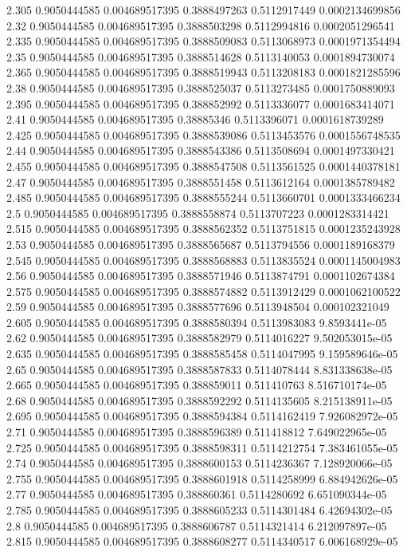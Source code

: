 {2.305 0.9050444585 0.004689517395 0.3888497263 0.5112917449 0.0002134699856
2.32 0.9050444585 0.004689517395 0.3888503298 0.5112994816 0.0002051296541
2.335 0.9050444585 0.004689517395 0.3888509083 0.5113068973 0.0001971354494
2.35 0.9050444585 0.004689517395 0.3888514628 0.5113140053 0.0001894730074
2.365 0.9050444585 0.004689517395 0.3888519943 0.5113208183 0.0001821285596
2.38 0.9050444585 0.004689517395 0.3888525037 0.5113273485 0.0001750889093
2.395 0.9050444585 0.004689517395 0.388852992 0.5113336077 0.0001683414071
2.41 0.9050444585 0.004689517395 0.38885346 0.5113396071 0.0001618739289
2.425 0.9050444585 0.004689517395 0.3888539086 0.5113453576 0.0001556748535
2.44 0.9050444585 0.004689517395 0.3888543386 0.5113508694 0.0001497330421
2.455 0.9050444585 0.004689517395 0.3888547508 0.5113561525 0.0001440378181
2.47 0.9050444585 0.004689517395 0.3888551458 0.5113612164 0.0001385789482
2.485 0.9050444585 0.004689517395 0.3888555244 0.5113660701 0.0001333466234
2.5 0.9050444585 0.004689517395 0.3888558874 0.5113707223 0.0001283314421
2.515 0.9050444585 0.004689517395 0.3888562352 0.5113751815 0.0001235243928
2.53 0.9050444585 0.004689517395 0.3888565687 0.5113794556 0.0001189168379
2.545 0.9050444585 0.004689517395 0.3888568883 0.5113835524 0.0001145004983
2.56 0.9050444585 0.004689517395 0.3888571946 0.5113874791 0.0001102674384
2.575 0.9050444585 0.004689517395 0.3888574882 0.5113912429 0.0001062100522
2.59 0.9050444585 0.004689517395 0.3888577696 0.5113948504 0.000102321049
2.605 0.9050444585 0.004689517395 0.3888580394 0.5113983083 9.8593441e-05
2.62 0.9050444585 0.004689517395 0.3888582979 0.5114016227 9.502053015e-05
2.635 0.9050444585 0.004689517395 0.3888585458 0.5114047995 9.159589646e-05
2.65 0.9050444585 0.004689517395 0.3888587833 0.5114078444 8.831338638e-05
2.665 0.9050444585 0.004689517395 0.388859011 0.511410763 8.516710174e-05
2.68 0.9050444585 0.004689517395 0.3888592292 0.5114135605 8.215138911e-05
2.695 0.9050444585 0.004689517395 0.3888594384 0.5114162419 7.926082972e-05
2.71 0.9050444585 0.004689517395 0.3888596389 0.511418812 7.649022965e-05
2.725 0.9050444585 0.004689517395 0.3888598311 0.5114212754 7.383461055e-05
2.74 0.9050444585 0.004689517395 0.3888600153 0.5114236367 7.128920066e-05
2.755 0.9050444585 0.004689517395 0.3888601918 0.5114258999 6.884942626e-05
2.77 0.9050444585 0.004689517395 0.388860361 0.5114280692 6.651090344e-05
2.785 0.9050444585 0.004689517395 0.3888605233 0.5114301484 6.42694302e-05
2.8 0.9050444585 0.004689517395 0.3888606787 0.5114321414 6.212097897e-05
2.815 0.9050444585 0.004689517395 0.3888608277 0.5114340517 6.006168929e-05
}
